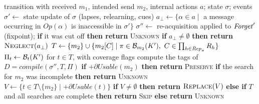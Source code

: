 \begin{algorithm}[t]
\caption{Bounded-enumeration decision for one human transition}\label{alg:decision}
\begin{algorithmic}[1]
\Require transition with received $m_1$, intended send $m_2$, internal actions $a$; state $\sigma$; events
\State $\sigma'\gets$ state update of $\sigma$ (lapses, relearning, cues)
\State $a_\bot\gets\{\alpha\in a\mid$ a message occurring in $\mathit{Op}(\alpha)$ is inaccessible in $\sigma'\}$
\State $\sigma''\gets$ re-acquisition applied to $\mathit{Forget}'$ (fixpoint); \textbf{if} it was cut off \textbf{then return} \textsc{Unknown}
\State \textbf{if} $a_\bot\neq\emptyset$ \textbf{then return} $\textsc{Neglect}(a_\bot)$ 
\State $T\gets\{m_2\}\cup\{m_2[C]\mid \pi\in\mathcal{B}_{m_2}(K'),\ C\in\prod_{h\in\mathit{Rep}_\pi}R_h\}$ 
\State $\Pi_t\gets\mathcal{B}_t(K')$ for $t\in T$, with coverage flags 
\State compute the tags of $D=\mathit{compile}(\sigma'',T,\Pi)$
\State \textbf{if} $+\partial\mathit{Usable}(m_2)$ \textbf{then return} \textsc{Preserve}
\State \textbf{if} the search for $m_2$ was incomplete \textbf{then return} \textsc{Unknown}
\State $V\gets\{t\in T\setminus\{m_2\}\mid +\partial\mathit{Usable}(t)\}$
\State \textbf{if} $V\neq\emptyset$ \textbf{then return} $\textsc{Replace}(V)$ 
\State \textbf{else if} $T$ and all searches are complete \textbf{then return} \textsc{Skip}
\State \textbf{else return} \textsc{Unknown}
\end{algorithmic}
\end{algorithm}

